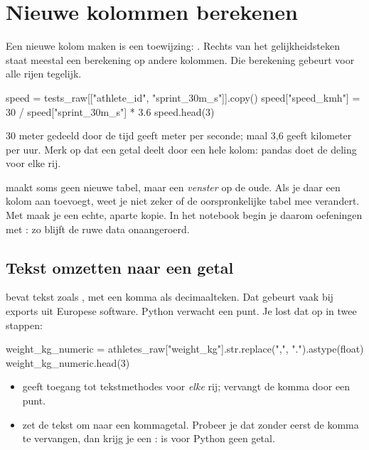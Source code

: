 \documentclass[11pt,a4paper]{article}
\begin{document}
\section{Nieuwe kolommen berekenen}

Een nieuwe kolom maken is een toewijzing: . Rechts van het gelijkheidsteken staat meestal een berekening op
andere kolommen. Die berekening gebeurt voor alle rijen tegelijk.

\begin{python}
speed = tests_raw[["athlete_id", "sprint_30m_s"]].copy()
speed["speed_kmh"] = 30 / speed["sprint_30m_s"] * 3.6
speed.head(3)
\end{python}

30 meter gedeeld door de tijd geeft meter per seconde; maal 3,6 geeft
kilometer per uur. Merk op dat  een
getal deelt door een hele kolom: pandas doet de deling voor elke rij.

\begin{opgelet}
 maakt soms geen nieuwe tabel, maar een
\emph{venster} op de oude. Als je daar een kolom aan toevoegt, weet je
niet zeker of de oorspronkelijke tabel mee verandert. Met
 maak je een echte, aparte kopie. In het notebook begin je
daarom oefeningen met : zo blijft de ruwe
data onaangeroerd.
\end{opgelet}

\subsection{Tekst omzetten naar een getal}

 bevat tekst zoals , met een komma als
decimaalteken. Dat gebeurt vaak bij exports uit Europese software.
Python verwacht een punt. Je lost dat op in twee stappen:

\begin{python}
weight_kg_numeric = athletes_raw["weight_kg"].str.replace(",", ".").astype(float)
weight_kg_numeric.head(3)
\end{python}

\begin{itemize}
  \item {} geeft toegang tot tekstmethodes voor \emph{elke} rij;
         vervangt de komma door een punt.
  \item {} zet de tekst om naar een kommagetal. Probeer
        je dat zonder eerst de komma te vervangen, dan krijg je een
        :  is voor Python geen getal.
\end{itemize}
\end{document}

